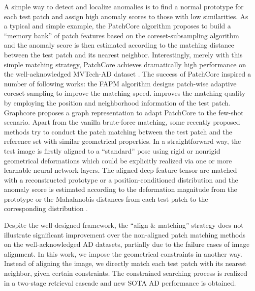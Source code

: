 \documentclass[lettersize,journal]{IEEEtran}
\begin{document}
A simple way to detect and localize anomalies is to find a normal prototype for each test
patch and assign high anomaly scores to those with low similarities. As a typical and
simple example, the PatchCore algorithm \cite{roth2022towards} proposes to build a
``memory bank'' of patch features based on the coreset-subsampling algorithm and the anomaly
score is then estimated according to the matching distance between the test patch
and its nearest neighbor. Interestingly, merely with this simple matching strategy, PatchCore
achieves dramatically high performance on the well-acknowledged MVTech-AD dataset
\cite{bergmann2019mvtec}.
The success of PatchCore inspired a number of following works: the FAPM algorithm
\cite{kim2022fapm} designs patch-wise adaptive coreset sampling to improve the matching
speed.  \cite{bae2022image} improves the matching quality by employing the position and
neighborhood information of the test patch. Graphcore \cite{xie2023pushing} proposes a
graph representation to adapt PatchCore to the few-shot scenario.
Apart from the vanilla brute-force matching, some recently proposed methods
\cite{huang2022registration, zheng2022focus, liu2023diversity} try to conduct the patch
matching between the test patch and the reference set with similar geometrical
properties. In a straightforward way, the test image is firstly aligned to a
``standard'' pose using rigid \cite{huang2022registration, zheng2022focus} or nonrigid
\cite{liu2023diversity} geometrical deformations which could be explicitly realized via
one or more learnable neural network layers. The aligned deep feature tensor are matched
with a reconstructed prototype \cite{liu2023diversity} or a position-conditioned
distribution \cite{huang2022registration, zheng2022focus} and the anomaly score is
estimated according to the deformation magnitude from the prototype
\cite{liu2023diversity} or the Mahalanobis distances from each test patch to the
corresponding distribution \cite{huang2022registration, zheng2022focus}.

Despite the well-designed framework, the ``align \& matching'' strategy does not
illustrate significant improvement over the non-aligned patch matching methods on the
well-acknowledged AD datasets, partially due to the failure cases of image alignment. In
this work, we impose the geometrical constraints in another way. Instead of aligning
the image, we directly match each test patch with its nearest neighbor, given certain
constraints. The constrained searching process is realized in a two-stage
retrieval cascade and new SOTA AD performance is obtained.
\end{document}
